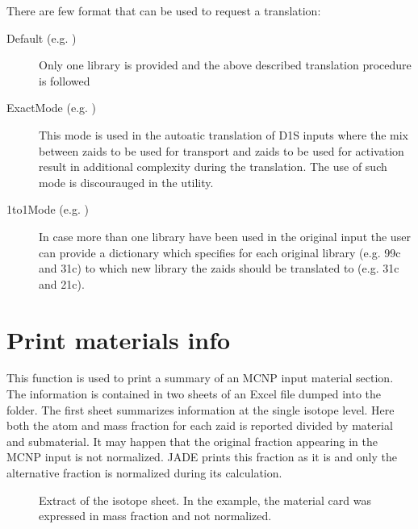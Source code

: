 \documentclass[letterpaper,10pt,english]{sphinxmanual}
\let\sphinxpxdimen\pdfpxdimen\else\newdimen\sphinxpxdimen
\begin{document}
There are few format that can be used to request a translation:
\begin{description}
\item[{Default (e.g. )}] \leavevmode
Only one library is provided and the above described translation
procedure is followed

\item[{ExactMode (e.g. )}] \leavevmode
This mode is used in the autoatic translation of D1S inputs where
the mix between zaids to be used for transport and zaids to be used
for activation result in additional complexity during the translation.
The use of such mode is discourauged in the  utility.

\item[{1to1Mode (e.g. )}] \leavevmode
In case more than one library have been used in the original input the
user can provide a dictionary which specifies for each original library
(e.g. 99c and 31c) to which new library the zaids should be translated to
(e.g. 31c and 21c).

\end{description}


\section{Print materials info}
\label{\detokenize{usage/utilities:print-materials-info}}

This function is used to print a summary of an MCNP input material section.
The information is contained in two sheets of an Excel file dumped into the
 folder.
The first sheet summarizes information at the single isotope level.
Here both the atom and mass fraction for each zaid is reported divided by
material and submaterial. It may happen that the original fraction appearing
in the MCNP input is not normalized. JADE prints this fraction as it is and
only the alternative fraction is normalized during its calculation.

\begin{figure}[htbp]
\centering
\capstart

\noindent\sphinxincludegraphics[width=600\sphinxpxdimen]{{printmat1}.png}
\caption{Extract of the isotope sheet. In the example, the material card was
expressed in mass fraction and not normalized.}\label{\detokenize{usage/utilities:id3}}\end{figure}
\end{document}
